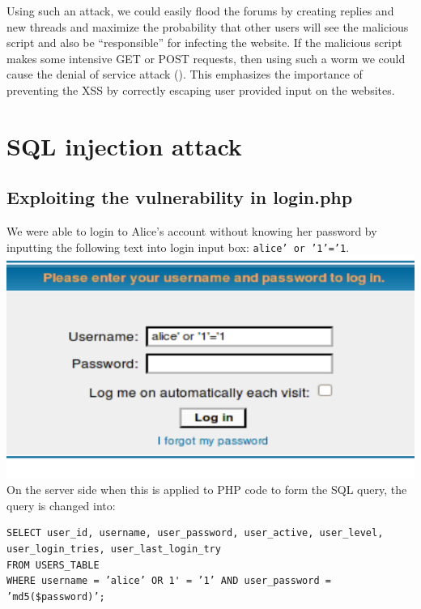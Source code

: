 \documentclass[12pt, a4paper]{article}
\begin{document}
Using such an attack, we could easily flood the forums by creating replies and new threads and maximize the probability that other users will see the malicious script and also be ``responsible'' for infecting the website. If the malicious script makes some intensive GET or POST requests, then using such a worm we could cause the denial of service attack (\cite{sunxss}). This emphasizes the importance of preventing the XSS by correctly escaping user provided input on the websites.

\section{SQL injection attack}

\subsection{Exploiting the vulnerability in login.php\label{sec:sql:login}}

We were able to login to Alice's account without knowing her password by inputting the following
text into login input box: \texttt{alice' or '1'='1}.\\

\includegraphics[width=.95\textwidth]{gfx/sql/login.png}\\

On the server side when this is applied to PHP code to form the SQL query, the query is changed into:

\lstset{
  captionpos=b,
  frame=single,
  language=SQL,
  breaklines=true,
  label=sql11
}
\begin{lstlisting}
SELECT user_id, username, user_password, user_active, user_level,
user_login_tries, user_last_login_try
FROM USERS_TABLE
WHERE username = ’alice’ OR 1' = ’1’ AND user_password = ’md5($password)’;
\end{lstlisting}
\end{document}
